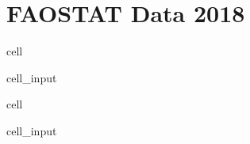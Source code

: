 \documentclass[letterpaper,10pt,english]{jupyterBook}
\begin{document}
\section{FAOSTAT Data 2018}
\label{\detokenize{notebooks/replicating_paper:id8}}
\begin{sphinxuseclass}{cell}\begin{sphinxVerbatimInput}

\begin{sphinxuseclass}{cell_input}
\begin{sphinxVerbatim}[commandchars=\\\{\}]
  

  
\end{sphinxVerbatim}

\end{sphinxuseclass}\end{sphinxVerbatimInput}

\end{sphinxuseclass}
\begin{sphinxuseclass}{cell}\begin{sphinxVerbatimInput}

\begin{sphinxuseclass}{cell_input}
\begin{sphinxVerbatim}[commandchars=\\\{\}]
  \PYG{p}{[}\PYG{p}{[}   \PYG{p}{]}\PYG{p}{]}
\end{sphinxVerbatim}

\end{sphinxuseclass}\end{sphinxVerbatimInput}

\end{sphinxuseclass}
\end{document}

